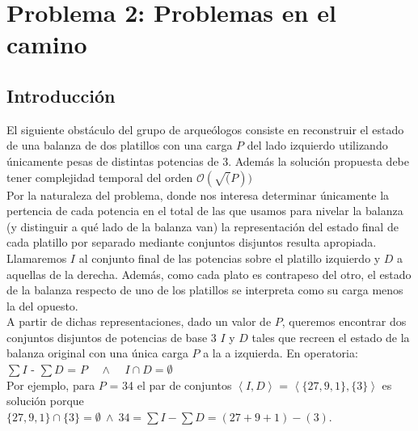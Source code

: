 \newpage
\section{Problema 2: Problemas en el camino}

\subsection{Introducción}
	El siguiente obstáculo del grupo de arqueólogos consiste en reconstruir el estado de una balanza de dos platillos con una carga $P$ del lado izquierdo utilizando únicamente pesas de distintas potencias de 3. Además la solución propuesta debe tener complejidad temporal del orden $\mathcal{O}(\sqrt(P))$
	\\

	Por la naturaleza del problema, donde nos interesa determinar únicamente la pertencia de cada potencia en el total de las que usamos para nivelar la balanza (y distinguir a qué lado de la balanza van) la representación del estado final de cada platillo por separado mediante conjuntos disjuntos resulta apropiada. Llamaremos $I$ al conjunto final de las potencias sobre el platillo izquierdo y $D$ a aquellas de la derecha. Además, como cada plato es contrapeso del otro, el estado de la balanza respecto de uno de los platillos se interpreta como su carga menos la del opuesto.
	\\

	A partir de dichas representaciones, dado un valor de $P$, queremos encontrar dos conjuntos disjuntos de potencias de base 3 $I$ y $D$ tales que recreen el estado de la balanza original con una única carga $P$ a la a izquierda. En operatoria:
	\\

	$\sum I$ - $\sum D$ = $P$ \ \ $\wedge$ \ \ $I \cap D = \emptyset$
	\\

	Por ejemplo, para $P$ = 34 el par de conjuntos $\left \langle I,D  \right \rangle$ = $\left \langle \{27,9,1\},\{3\}  \right \rangle$ es solución porque \\
	$\{27,9,1\} \cap \{3\} = \emptyset \ \wedge \ 34 = \sum I - \sum D = (27+9+1)-(3)$.
	\\



